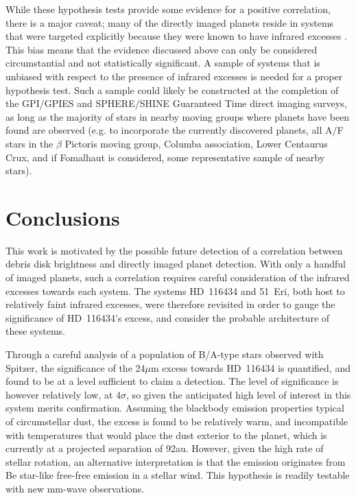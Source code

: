 \documentclass[a4paper,fleqn,usenatbib]{mnras}
\begin{document}
While these hypothesis tests provide some evidence for a positive
correlation, there is a major caveat; many of the directly imaged
planets reside in systems that were targeted explicitly because they
were known to have infrared excesses
\citep[e.g. HD~95086,][]{2013A&A...553A..60R,2013ApJ...772L..15R}. This
bias means that the evidence discussed above can only be considered
circumstantial and not statistically significant. A sample of systems
that is unbiased with respect to the presence of infrared excesses is
needed for a proper hypothesis test. Such a sample could likely be
constructed at the completion of the GPI/GPIES and SPHERE/SHINE
Guaranteed Time direct imaging surveys, as long as the majority of stars
in nearby moving groups where planets have been found are observed
(e.g. to incorporate the currently discovered planets, all A/F stars in
the $\beta$ Pictoris moving group, Columba association, Lower Centaurus
Crux, and if Fomalhaut is considered, some representative sample of
nearby stars).

\section{Conclusions}\label{s:conc}

This work is motivated by the possible future detection of a correlation
between debris disk brightness and directly imaged planet
detection. With only a handful of imaged planets, such a correlation
requires careful consideration of the infrared excesses towards each
system. The systems HD~116434 and 51~Eri, both host to relatively faint
infrared excesses, were therefore revisited in order to gauge the
significance of HD~116434's excess, and consider the probable
architecture of these systems.

Through a careful analysis of a population of B/A-type stars observed
with Spitzer, the significance of the 24$\mu$m excess towards HD~116434
is quantified, and found to be at a level sufficient to claim a
detection. The level of significance is however relatively low, at
4$\sigma$, so given the anticipated high level of interest in this
system merits confirmation. Assuming the blackbody emission properties
typical of circumstellar dust, the excess is found to be relatively
warm, and incompatible with temperatures that would place the dust
exterior to the planet, which is currently at a projected separation of
92au. However, given the high rate of stellar rotation, an alternative
interpretation is that the emission originates from Be star-like
free-free emission in a stellar wind. This hypothesis is readily
testable with new mm-wave observations.
\end{document}
